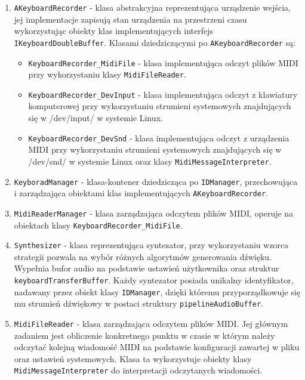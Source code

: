 \begin{enumerate}
    \item \texttt{AKeyboardRecorder} - klasa abstrakcyjna reprezentująca urządzenie wejścia, jej implementacje zapisują stan urządzenia na przestrzeni czasu wykorzystując obiekty klas implementujących interfejs \texttt{IKeyboardDoubleBuffer}. Klasami dziedziczącymi po \texttt{AKeyboardRecorder} są:
    \begin{itemize}
        \item \texttt{KeyboardRecorder\_MidiFile} - klasa implementująca odczyt plików MIDI przy wykorzystaniu klasy \texttt{MidiFileReader}.
        \item \texttt{KeyboardRecorder\_DevInput} - klasa implementująca odczyt z klawiatury komputerowej przy wykorzystaniu strumieni systemowych znajdujących się w /dev/input/ w systemie Linux.
        \item \texttt{KeyboardRecorder\_DevSnd} - klasa implementująca odczyt z urządzenia MIDI przy wykorzystaniu strumieni systemowych znajdujących się w /dev/snd/ w systemie Linux oraz klasy \texttt{MidiMessageInterpreter}.
    \end{itemize}
    \item \texttt{KeyboradManager} - klasa-kontener dziedzicząca po \texttt{IDManager}, przechowująca i zarządzająca obiektami klas implementujących \texttt{AKeyboardRecorder}.
    \item \texttt{MidiReaderManager} - klasa zarządzająca odczytem plików MIDI, operuje na  obiektach klasy \texttt{KeyboardRecorder\_MidiFile}.
    \item \texttt{Synthesizer} - klasa reprezentująca syntezator, przy wykorzystaniu wzorca strategii pozwala na wybór różnych algorytmów generowania dźwięku. Wypełnia bufor audio na podstawie ustawień użytkownika oraz struktur \texttt{keyboardTransferBuffer}. Każdy syntezator posiada unikalny identyfikator, nadawany przez obiekt klasy \texttt{IDManager}, dzięki któremu przyporządkowuje się mu strumień dźwiękowy w postaci struktury \texttt{pipelineAudioBuffer}.
    \item \texttt{MidiFileReader} - klasa zarządzająca odczytem plików MIDI. Jej głównym zadaniem jest obliczenie konkretnego punktu w czasie w którym należy odczytać kolejną wiadomość MIDI na podstawie konfiguracji zawartej w pliku oraz ustawień systemowych. Klasa ta wykorzystuje obiekty klasy \texttt{MidiMessageInterpreter} do interpretacji odczytanych wiadomości.
\end{enumerate}

